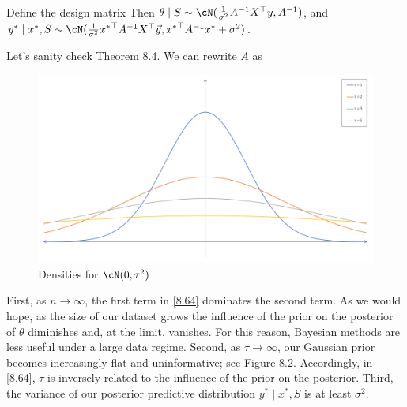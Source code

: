 \begin{theorem}
Define the design matrix 
Then $\theta \mid S \sim \cN(\frac{1}{\sigma^2}A^{-1}X^\top \vec{y}, A^{-1})$, and $y^* \mid x^*, S \sim \cN (\frac{1}{\sigma^2} {x^*}^\top A^{-1}X^\top \vec{y}, {x^*}^\top A^{-1} x^* + \sigma^2)$.
\end{theorem}
Let's sanity check Theorem 8.4. We can rewrite $A$ as

\begin{figure}[h!]
\caption{Densities for $\cN(0, \tau^2)$}
\centering \includegraphics[width=\linewidth]{figure/Lecture08/fig-2.pdf}
\end{figure}

First, as $n \rightarrow \infty$, the first term in \eqref{8.64} dominates the second term. As we would hope, as the size of our dataset grows the influence of the prior on the posterior of $\theta$ diminishes and, at the limit, vanishes. For this reason, Bayesian methods are less useful under a large data regime. Second, as $\tau \rightarrow \infty$, our Gaussian prior becomes increasingly flat and uninformative; see Figure 8.2. Accordingly, in \eqref{8.64}, $\tau$ is inversely related to the influence of the prior on the posterior. Third, the variance of our posterior predictive distribution $y^* \mid x^*, S$ is at least $\sigma^2$. 


